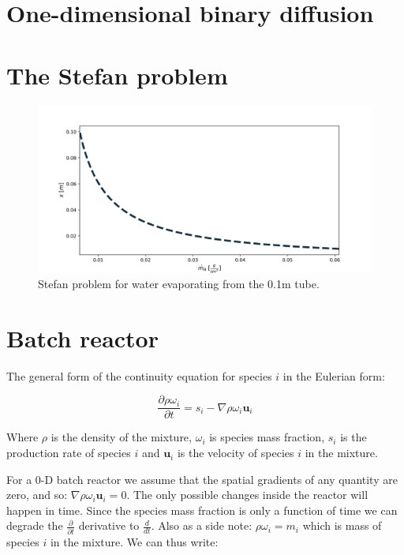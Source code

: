 \documentclass[10pt]{article}
\begin{document}
\newpage

\section{One-dimensional binary diffusion}



\newpage

\section{The Stefan problem}

\begin{figure}[H]
\centering\includegraphics[width=16cm]{Code/stefan-problem.png}
\caption{Stefan problem for water evaporating from the 0.1m tube.}
\label{fig:stefan-problem}
\end{figure}




\newpage

\section{Batch reactor}

The general form of the continuity equation for species $i$ in the Eulerian form:

\begin{equation} \label{eq:species-mass-conservation}
\frac{\partial \rho \omega_i}{\partial t} = s_i - \nabla \rho \omega_i \mathbf{u}_{i}
\end{equation}

Where $\rho$ is the density of the mixture, $\omega_i$ is species mass fraction, $s_i$ is the production rate of species $i$ and $\mathbf{u}_i$ is the velocity of species $i$ in the mixture.

For a 0-D batch reactor we assume that the spatial gradients of any quantity are zero, and so: $ \nabla \rho \omega_i \mathbf{u}_{i} = 0$. The only possible changes inside the reactor will happen in time. Since the species mass fraction is only a function of time we can degrade the $\frac{\partial}{\partial t}$ derivative to $\frac{d}{dt}$. Also as a side note: $\rho \omega_i = m_i$ which is mass of species $i$ in the mixture. We can thus write:
\end{document}
